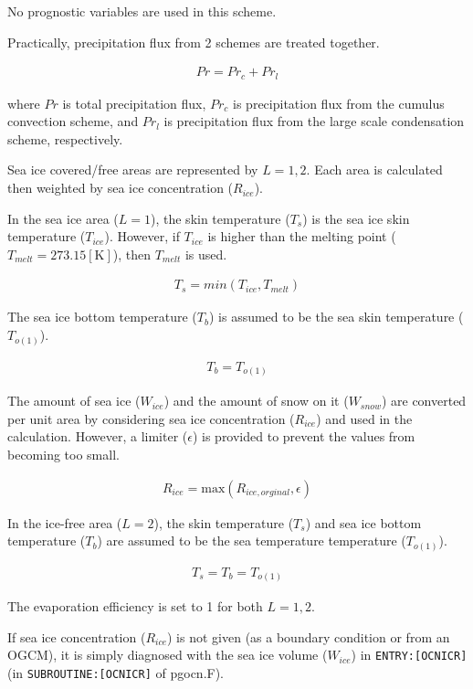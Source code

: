 No prognostic variables are used in this scheme.

Practically, precipitation flux from 2 schemes are treated together.

\begin{eqnarray}
    Pr = Pr_c + Pr_l
\end{eqnarray}

where \(Pr\) is total precipitation flux, \(Pr_c\) is precipitation flux
from the cumulus convection scheme, and \(Pr_l\) is precipitation flux
from the large scale condensation scheme, respectively.

Sea ice covered/free areas are represented by \(L=1,2\). Each area is
calculated then weighted by sea ice concentration (\(R_{ice}\)).

In the sea ice area (\(L=1\)), the skin temperature (\(T_s\)) is the sea
ice skin temperature (\(T_{ice}\)). However, if \(T_{ice}\) is higher
than the melting point (\(T_{melt}=273.15 \mathrm{[K]}\)), then
\(T_{melt}\) is used.

\begin{eqnarray}
    T_s = min(T_{ice},T_{melt})
\end{eqnarray}

The sea ice bottom temperature (\(T_b\)) is assumed to be the sea skin
temperature (\(T_{o(1)}\)).

\begin{eqnarray}
    T_b = T_{o(1)}
\end{eqnarray}

The amount of sea ice (\(W_{ice}\)) and the amount of snow on it
(\(W_{snow}\)) are converted per unit area by considering sea ice
concentration (\(R_{ice}\)) and used in the calculation. However, a
limiter (\(\epsilon\)) is provided to prevent the values from becoming
too small.

\begin{eqnarray}
R_{ice} =\mathrm{max}( R_{ice,orginal}, \epsilon)
\end{eqnarray}

In the ice-free area (\(L=2\)), the skin temperature (\(T_s\)) and sea
ice bottom temperature (\(T_b\)) are assumed to be the sea temperature
temperature (\(T_{o(1)}\)).

\begin{eqnarray}
    T_s = T_b = T_{o(1)}
\end{eqnarray}

The evaporation efficiency is set to 1 for both \(L=1, 2\).

If sea ice concentration (\(R_{ice}\)) is not given (as a boundary
condition or from an OGCM), it is simply diagnosed with the sea ice
volume (\(W_{ice}\)) in \texttt{ENTRY:{[}OCNICR{]}} (in
\texttt{SUBROUTINE:{[}OCNICR{]}} of pgocn.F).

